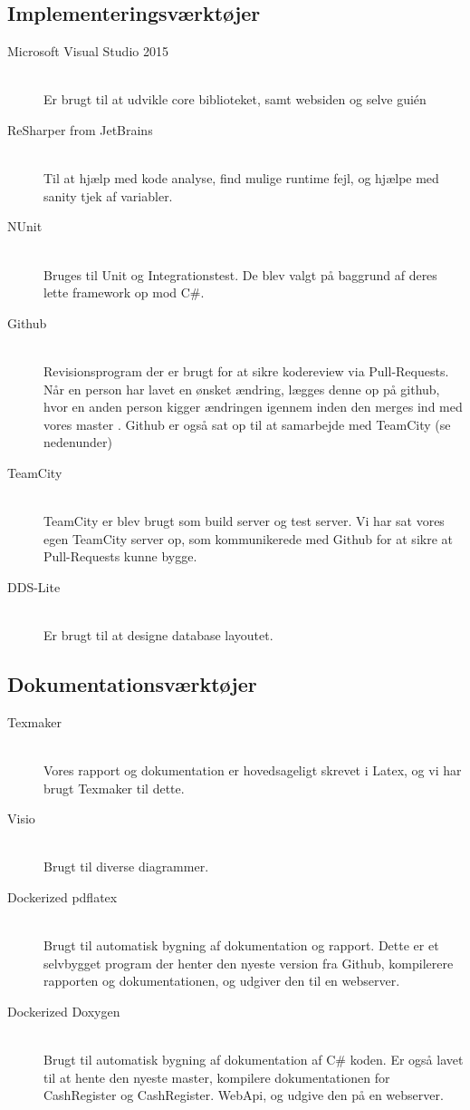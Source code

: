 \subsection{Implementeringsværktøjer}
\begin{description}
  \item[Microsoft Visual Studio 2015] \hfill \\
  Er brugt til at udvikle core biblioteket, samt websiden og selve gui\'en
  \item[ReSharper from JetBrains] \hfill \\
  Til at hjælp med kode analyse, find mulige runtime fejl, og hjælpe med sanity tjek af variabler.
  \item[NUnit] \hfill \\
  Bruges til Unit og Integrationstest. De blev valgt på baggrund af deres lette framework op mod C\#.
  \item[Github] \hfill \\
  Revisionsprogram der er brugt for at sikre kodereview via Pull-Requests\cite{gh:pullrequests}. Når en person har lavet en ønsket ændring, lægges denne op på github, hvor en anden person kigger ændringen igennem inden den merges ind med vores master \citeauthor{gh:pullrequests}. Github er også sat op til at samarbejde med TeamCity (se nedenunder)
  \item[TeamCity] \hfill \\
  TeamCity er blev brugt som build server og test server. Vi har sat vores egen TeamCity server op, som kommunikerede med Github for at sikre at Pull-Requests kunne bygge.
  \item[DDS-Lite] \hfill \\
  Er brugt til at designe database layoutet.
\end{description}

\subsection{Dokumentationsværktøjer}
\begin{description}
  \item[Texmaker] \hfill \\
  Vores rapport og dokumentation er hovedsageligt skrevet i Latex, og vi har brugt Texmaker til dette.
  \item[Visio] \hfill \\
  Brugt til diverse diagrammer.
  \item[Dockerized pdflatex] \hfill \\
  Brugt til automatisk bygning af dokumentation og rapport. Dette er et selvbygget program der henter den nyeste version fra Github, kompilerere rapporten og dokumentationen, og udgiver den til en webserver.
  \item[Dockerized Doxygen] \hfill \\
  Brugt til automatisk bygning af dokumentation af C\# koden. Er også lavet til at hente den nyeste master, kompilere dokumentationen for CashRegister og CashRegister. WebApi\citep{gh:aspnet}, og udgive den på en webserver.
\end{description}

